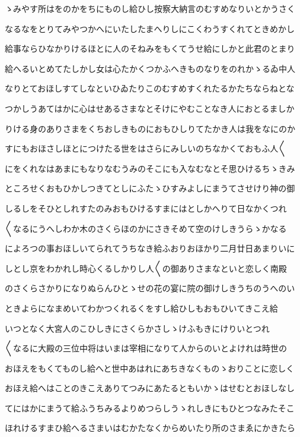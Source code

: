 \documentclass[a4paper,11pt,landscape]{ltjtarticle}
\begin{document}
ゝみやす所はをのかをちにものし給ひし按察大納言のむすめなりいとかうさく
\par\medskip
なるなをとりてみやつかへにいたしたまへりしにこくわうすくれてときめかし
\par\medskip
給事ならひなかりけるほとに人のそねみをもくてうせ給にしかと此君のとまり
\par\medskip
給へるいとめてたしかし女は心たかくつかふへきものなりをのれかゝるゐ中人
\par\medskip
なりとておほしすてしなといひゐたりこのむすめすくれたるかたちならねとな
\par\medskip
つかしうあてはかに心はせあるさまなとそけにやむことなき人におとるましか
\par\medskip
りける身のありさまをくちおしきものにおもひしりてたかき人は我をなにのか
\par\medskip
すにもおほさしほとにつけたる世をはさらにみしいのちなかくておもふ人〱
\par\medskip
にをくれなはあまにもなりなむうみのそこにも入なむなとそ思ひけるちゝきみ
\par\medskip
ところせくおもひかしつきてとしにふたゝひすみよしにまうてさせけり神の御
\par\medskip
しるしをそひとしれすたのみおもひけるすまにはとしかへりて日なかくつれ
\par\medskip
〱なるにうへしわか木のさくらほのかにさきそめて空のけしきうらゝかなる
\par\medskip
によろつの事おほしいてられてうちなき給ふおりおほかり二月廿日あまりいに
\par\medskip
しとし京をわかれし時心くるしかりし人〱の御ありさまなといと恋しく南殿
\par\medskip
のさくらさかりになりぬらんひとゝせの花の宴に院の御けしきうちのうへのい
\par\medskip
ときよらになまめいてわかつくれるくをすし給ひしもおもひいてきこえ給
\par\medskip
いつとなく大宮人のこひしきにさくらかさしゝけふもきにけりいとつれ
\par\medskip
〱なるに大殿の三位中将はいまは宰相になりて人からのいとよけれは時世の
\par\medskip
おほえをもくてものし給へと世中あはれにあちきなくものゝおりことに恋しく
\par\medskip
おほえ給へはことのきこえありてつみにあたるともいかゝはせむとおほしなし
\par\medskip
てにはかにまうて給ふうちみるよりめつらしうゝれしきにもひとつなみたそこ
\par\medskip
ほれけるすまひ給へるさまいはむかたなくからめいたり所のさまゑにかきたら
\end{document}
